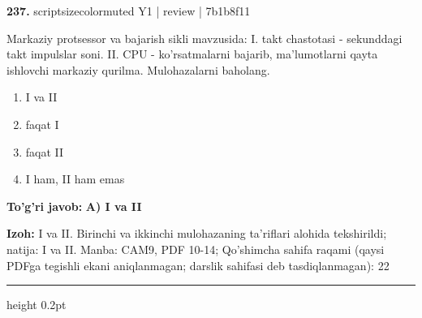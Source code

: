 \documentclass[10pt,a4paper]{article}
\begin{document}
{\bfseries\sffamily\color{ink} 237.} {scriptsizecolor{muted} Y1 | review | 7b1b8f11}
\par
Markaziy protsessor va bajarish sikli mavzusida: I. takt chastotasi - sekunddagi takt impulslar soni. II. CPU - ko'rsatmalarni bajarib, ma'lumotlarni qayta ishlovchi markaziy qurilma. Mulohazalarni baholang.
\begin{enumerate}[label=\Alph*),leftmargin=9mm]
\item I va II
\item faqat I
\item faqat II
\item I ham, II ham emas
\end{enumerate}
\begin{tcolorbox}[enhanced,breakable,colback=teal!4,colframe=teal!60!black,boxrule=0.45pt,arc=1.2mm,left=2.7mm,right=2.7mm,top=1.8mm,bottom=1.8mm,before skip=2mm,after skip=2mm]
{\bfseries\sffamily\color{teal}To'g'ri javob:} \textbf{A) I va II}
\par\smallskip
{\bfseries Izoh:} I va II. Birinchi va ikkinchi mulohazaning ta'riflari alohida tekshirildi; natija: I va II. Manba: CAM9, PDF 10-14; Qo'shimcha sahifa raqami (qaysi PDFga tegishli ekani aniqlanmagan; darslik sahifasi deb tasdiqlanmagan): 22
\end{tcolorbox}
\vspace{2mm}\hrule height 0.2pt\vspace{3mm}
\end{document}
